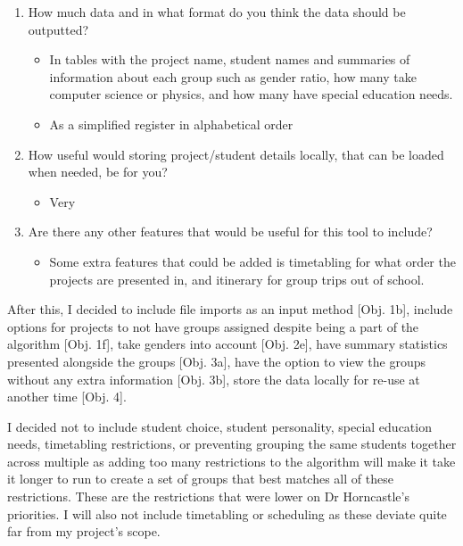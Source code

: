 \documentclass{article}
\begin{document}
\begin{enumerate}
    \item How much data and in what format do you think the data should be outputted?
        \begin{itemize} \item In tables with the project name, student names and summaries of information about each group such as gender ratio, how many take computer science or physics, and how many have special education needs. \item As a simplified register in alphabetical order \end{itemize}
    \item How useful would storing project/student details locally, that can be loaded when needed, be for you?
            \begin{itemize} \item Very \end{itemize}
    \item Are there any other features that would be useful for this tool to include?
        \begin{itemize} \item Some extra features that could be added is timetabling for what order the projects are presented in, and itinerary for group trips out of school. \end{itemize}
\end{enumerate}

After this, I decided to include file imports as an input method [Obj. 1b], include options for projects to not have groups assigned despite being a part of the algorithm [Obj. 1f], take genders into account [Obj. 2e], have summary statistics presented alongside the groups [Obj. 3a], have the option to view the groups without any extra information [Obj. 3b], store the data locally for re-use at another time [Obj. 4].

I decided not to include student choice, student personality, special education needs, timetabling restrictions, or preventing grouping the same students together across multiple as adding too many restrictions to the algorithm will make it take it longer to run to create a set of groups that best matches all of these restrictions. These are the restrictions that were lower on Dr Horncastle's priorities. I will also not include timetabling or scheduling as these deviate quite far from my project's scope.
\end{document}
